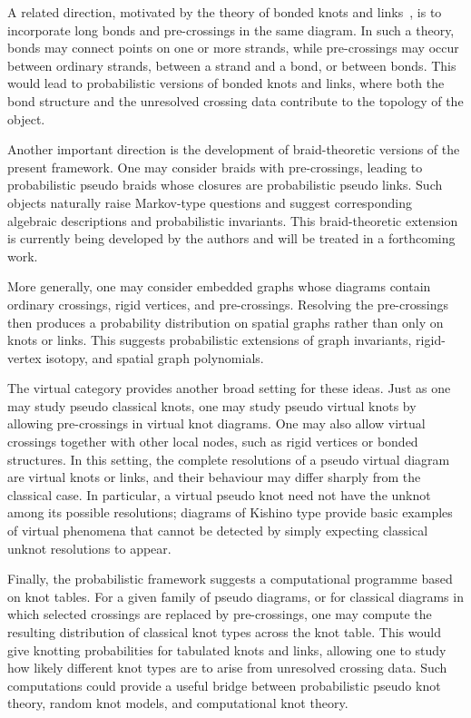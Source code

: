 \documentclass[a4paper, reqno, 12pt]{amsart}
\theoremstyle{plain}
\theoremstyle{definition}
\begin{document}
A related direction, motivated by the theory of bonded knots and links~\cite{DiamantisKauffmanLambropoulou2025}, is to incorporate long bonds and pre-crossings in the same diagram. In such a theory, bonds may connect points on one or more strands, while pre-crossings may occur between ordinary strands, between a strand and a bond, or between bonds. This would lead to probabilistic versions of bonded knots and links, where both the bond structure and the unresolved crossing data contribute to the topology of the object.

Another important direction is the development of braid-theoretic versions of the present framework. One may consider braids with pre-crossings, leading to probabilistic pseudo braids whose closures are probabilistic pseudo links. Such objects naturally raise Markov-type questions and suggest corresponding algebraic descriptions and probabilistic invariants. This braid-theoretic extension is currently being developed by the authors and will be treated in a forthcoming work.

More generally, one may consider embedded graphs whose diagrams contain ordinary crossings, rigid vertices, and pre-crossings. Resolving the pre-crossings then produces a probability distribution on spatial graphs rather than only on knots or links. This suggests probabilistic extensions of graph invariants, rigid-vertex isotopy, and spatial graph polynomials.

The virtual category provides another broad setting for these ideas. Just as one may study pseudo classical knots, one may study pseudo virtual knots by allowing pre-crossings in virtual knot diagrams. One may also allow virtual crossings together with other local nodes, such as rigid vertices or bonded structures. In this setting, the complete resolutions of a pseudo virtual diagram are virtual knots or links, and their behaviour may differ sharply from the classical case. In particular, a virtual pseudo knot need not have the unknot among its possible resolutions; diagrams of Kishino type provide basic examples of virtual phenomena that cannot be detected by simply expecting classical unknot resolutions to
appear.

Finally, the probabilistic framework suggests a computational programme based on knot tables. For a given family of pseudo diagrams, or for classical diagrams in which selected crossings are replaced by pre-crossings, one may compute the resulting distribution of classical knot types across the knot table. This would give knotting probabilities for
tabulated knots and links, allowing one to study how likely different knot types are to arise from unresolved crossing data. Such computations could provide a useful bridge between probabilistic pseudo knot theory, random knot models, and computational knot theory.
\end{document}
